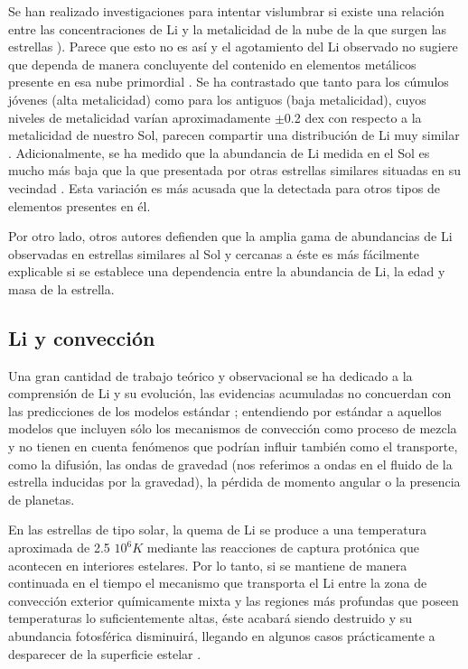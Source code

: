 Se han realizado investigaciones para intentar vislumbrar si existe una relación entre las concentraciones de Li y la metalicidad de la nube de la que surgen las estrellas \cite{Pinsonneault1997, BarradoyNavascues2001}). Parece que esto no es así y el agotamiento del Li observado no sugiere que dependa de manera concluyente del contenido en elementos metálicos presente en esa nube primordial \cite{Guiglion2016}. Se ha contrastado que tanto para los cúmulos jóvenes (alta metalicidad) como para los antiguos (baja metalicidad), cuyos niveles de metalicidad varían aproximadamente $\pm$0.2 dex con respecto a la metalicidad de nuestro Sol, parecen compartir una distribución de Li muy similar \cite{Sestito2005}. Adicionalmente, se ha medido que la abundancia de Li medida en el Sol es mucho más baja que la que presentada por otras estrellas similares situadas en su vecindad \cite{Reddy2003}. Esta variación es más acusada que la detectada para otros tipos de elementos presentes en él.\par

Por otro lado, otros autores \cite{Sestito2005} defienden que la amplia gama de abundancias de Li observadas en estrellas similares al Sol y cercanas a éste es más fácilmente explicable si se establece una dependencia entre la abundancia de Li, la edad y masa de la estrella.\par

\subsection{Li y convección}
Una gran cantidad de trabajo teórico y observacional se ha dedicado a la comprensión de Li y su evolución, las evidencias acumuladas no concuerdan con las predicciones de los modelos estándar \cite{Sestito2005}; entendiendo por estándar a aquellos modelos que incluyen sólo los mecanismos de convección como proceso de mezcla y no tienen en cuenta fenómenos que podrían influir también como el transporte, como la difusión, las ondas de gravedad (nos referimos a ondas en el fluido de la estrella inducidas por la gravedad), la pérdida de momento angular o la presencia de planetas.\par

En las estrellas de tipo solar, la quema de Li se produce a una temperatura aproximada de 2.5 $10^{6} K$ mediante las reacciones de captura protónica que acontecen en interiores estelares. Por lo tanto, si se mantiene de manera continuada en el tiempo el mecanismo que transporta el Li entre la zona de convección exterior químicamente mixta y las regiones más profundas que poseen temperaturas lo suficientemente altas, éste acabará siendo destruido y su abundancia fotosférica disminuirá, llegando en algunos casos prácticamente a desparecer de la superficie estelar \cite{DelgadoMena2014}.\par

